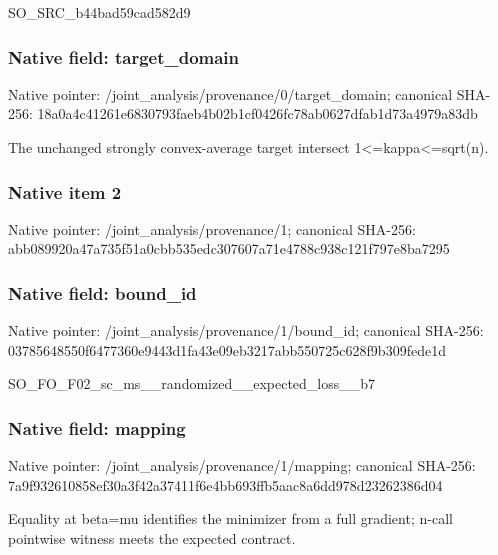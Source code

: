 \documentclass[10pt,a4paper]{article}
\begin{document}
\begingroup\raggedright\sloppy SO\_\allowbreak{}SRC\_\allowbreak{}b44bad59cad582d9\par\endgroup

\subsubsection{Native field: target\_\allowbreak{}domain}
Native pointer: /joint\_\allowbreak{}analysis/provenance/0/target\_\allowbreak{}domain; canonical SHA-256: 18a0a4c41261e6830793faeb4b02b1cf0426fc78ab0627dfab1d73a4979a83db

\begingroup\raggedright\sloppy The unchanged strongly convex-average target intersect 1<=\allowbreak{}kappa<=\allowbreak{}sqrt(n).\par\endgroup

\subsubsection{Native item 2}
Native pointer: /joint\_\allowbreak{}analysis/provenance/1; canonical SHA-256: abb089920a47a735f51a0cbb535edc307607a71e4788c938c121f797e8ba7295

\subsubsection{Native field: bound\_\allowbreak{}id}
Native pointer: /joint\_\allowbreak{}analysis/provenance/1/bound\_\allowbreak{}id; canonical SHA-256: 03785648550f6477360e9443d1fa43e09eb3217abb550725c628f9b309fede1d

\begingroup\raggedright\sloppy SO\_\allowbreak{}FO\_\allowbreak{}F02\_\allowbreak{}sc\_\allowbreak{}ms\_\allowbreak{}\_\allowbreak{}randomized\_\allowbreak{}\_\allowbreak{}expected\_\allowbreak{}loss\_\allowbreak{}\_\allowbreak{}b7\par\endgroup

\subsubsection{Native field: mapping}
Native pointer: /joint\_\allowbreak{}analysis/provenance/1/mapping; canonical SHA-256: 7a9f932610858ef30a3f42a37411f6e4bb693ffb5aac8a6dd978d23262386d04

\begingroup\raggedright\sloppy Equality at beta=\allowbreak{}mu identifies the minimizer from a full gradient;\allowbreak{} n-call pointwise witness meets the expected contract.\par\endgroup
\end{document}
